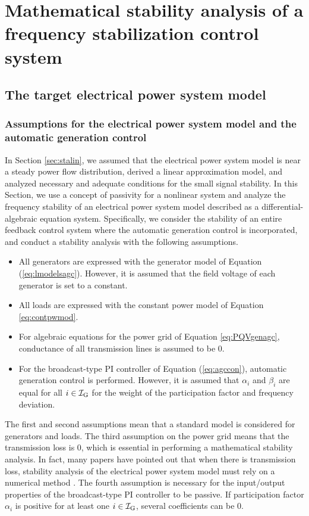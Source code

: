 \documentclass[tombow,dvipdfmx]{corona-a5-1.1}
\begin{document}
\section{Mathematical stability analysis of a frequency stabilization control system\advanced}\label{sec:mathnpas}

\subsection{The target electrical power system model\advanced}\label{sec:objmod}

\smallskip
\subsubsection{Assumptions for the electrical power system model and the automatic generation control}

In Section \ref{sec:stalin}, we assumed that the electrical power system model is near a steady power flow distribution, derived a linear approximation model, and analyzed necessary and adequate conditions for the small signal stability.
In this Section, we use a concept of passivity for a nonlinear system and analyze the frequency stability of an electrical power system model described as a differential-algebraic equation system.
Specifically, we consider the stability of an entire feedback control system where the automatic generation control is incorporated, and conduct a stability analysis with the following assumptions.

\begin{itemize}
\item All generators are expressed with the generator model of Equation (\ref{eq:lmodelsagc}). However, it is assumed that the field voltage of each generator is set to a constant.
\item All loads are expressed with the constant power model of Equation \ref{eq:contpwmod}.
\item For algebraic equations for the power grid of Equation \ref{eq:PQVgenagc}, conductance of all transmission lines is assumed to be 0.
\item For the broadcast-type PI controller of Equation (\ref{eq:agccon}), automatic generation control is performed.
However, it is assumed that $\alpha_i$ and $\beta_i$ are equal for all $i\in \mathcal{I}_{\rm G}$ for the weight of the participation factor and
frequency deviation.
\end{itemize}

The first and second assumptions mean that a standard model is considered for generators and loads.
The third assumption on the power grid means that the transmission loss is 0, which is essential in performing a mathematical stability analysis.
In fact, many papers have pointed out that when there is transmission loss, stability analysis of the electrical power system model must rely on a numerical method \cite{narasimhamurthi1984existence,chang1995direct,chiang2011direct,yang2019distributed}.
The fourth assumption is necessary for the input/output properties of the broadcast-type PI controller to be passive.
If participation factor $\alpha_i$ is positive for at least one $i\in \mathcal{I}_{\rm G}$, several coefficients can be 0.
\end{document}

